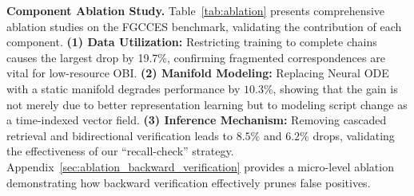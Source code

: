\documentclass{article}
\begin{document}
\textbf{Component Ablation Study.}
Table~\ref{tab:ablation} presents comprehensive ablation studies on the FGCCES benchmark, validating the contribution of each component. 
\textbf{(1) Data Utilization:} Restricting training to complete chains causes the largest drop by 19.7\%, confirming fragmented correspondences are vital for low-resource OBI.
\textbf{(2) Manifold Modeling:} Replacing Neural ODE with a static manifold degrades performance by $10.3\%$, showing that the gain is not merely due to better representation learning but to modeling script change as a time-indexed vector field.
\textbf{(3) Inference Mechanism:} Removing cascaded retrieval and bidirectional verification leads to $8.5\%$ and $6.2\%$ drops, validating the effectiveness of our ``recall-check'' strategy. Appendix~\ref{sec:ablation_backward_verification} provides a micro-level ablation demonstrating how backward verification effectively prunes false positives.


\end{document}
